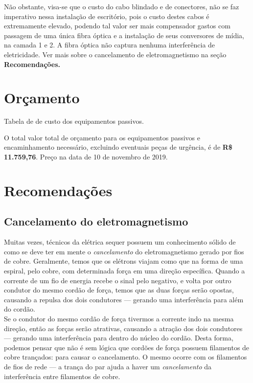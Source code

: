 \documentclass[	DIV=calc,%
							paper=a4,%
							fontsize=12pt,%
							onecolumn]{scrartcl}	 					%
\begin{document}
Não obstante, visa-se que o custo do cabo blindado e de conectores, não se faz imperativo nessa instalação de escritório, pois o custo destes cabos é extremamente elevado, podendo tal valor ser mais compensador gastos com passagem de uma única fibra óptica e a instalação de seus conversores de mídia, na camada 1 e 2. A fibra óptica não captura nenhuma interferência de eletricidade. Ver mais sobre o cancelamento de eletromagnetismo na seção \textbf{Recomendações.}
\\

\pagebreak

\section{Orçamento}
Tabela de de custo dos equipamentos passivos.
\vspace{0.5cm}











O total valor total de orçamento para os equipamentos passivos e encaminhamento necessário, excluindo eventuais peças de urgência, é de \textbf{R\$ 11.759,76}.
Preço na data de 10 de novembro de 2019.

\pagebreak

\section{Recomendações}

\subsection{Cancelamento do eletromagnetismo}

Muitas vezes, técnicos da elétrica sequer possuem um conhecimento sólido de como se deve ter em mente o \textit{cancelamento} do eletromagnetismo gerado por fios de cobre. Geralmente, temos que os elétrons viajam como que na forma de uma espiral, pelo cobre, com determinada força em uma direção específica. Quando a corrente de um fio de energia recebe o sinal pelo negativo, e volta por outro condutor do mesmo cordão de força, temos que as duas forças serão opostas, causando a repulsa dos dois condutores --- gerando uma interferência para além do cordão. 
\\

Se o condutor do mesmo cordão de força tivermos a corrente indo na mesma direção, então as forças serão atrativas, causando a atração dos dois condutores --- gerando uma interferência para dentro do núcleo do cordão. Desta forma, podemos pensar que não é sem lógica que cordões de força possuem filamentos de cobre trançados: para causar o cancelamento. O mesmo ocorre com os filamentos de fios de rede --- a trança do par ajuda a haver um \textit{cancelamento} da interferência entre filamentos de cobre.
\\
\end{document}
